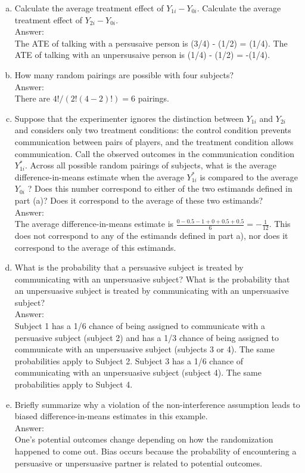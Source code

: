 \documentclass[11pt,notitlepage]{article}\usepackage[]{graphicx}\usepackage[]{color}
\begin{document}
\begin{enumerate}[a)]
\item Calculate the average treatment effect of $Y_{1i} - Y_{0i}$. Calculate the average treatment effect of $Y_{2i} - Y_{0i}$.\\
Answer:\\
The ATE of talking with a persusaive person is (3/4) - (1/2) = (1/4). The ATE of talking with an unpersusaive person is (1/4) - (1/2) = -(1/4). 
\item How many random pairings are possible with four subjects?\\
Answer:\\
There are $4!/(2!(4-2)!) = 6$ pairings.
\item Suppose that the experimenter ignores the distinction between $Y_{1i}$ and $Y_{2i}$ and considers only two treatment conditions: the control condition prevents communication between pairs of players, and the treatment condition allows communication. Call the observed outcomes in the communication condition $Y^{*}_{1i}$. Across all possible random pairings of subjects, what is the average difference-in-means estimate when the average $Y^{*}_{1i}$ is compared to the average $Y_{0i}$ ? Does this number correspond to either of the two estimands defined in part (a)? Does it correspond to the average of these two estimands? \\
Answer:\\
The average difference-in-means estimate is $\frac{0 - 0.5 -1 + 0 + 0.5 + 0.5}{6} = -\frac{1}{12}$. This does not correspond to any of the estimands defined in part a), nor does it correspond to the average of this estimands.

\item What is the probability that a persuasive subject is treated by communicating with an unpersuasive subject? What is the probability that an unpersuasive subject is treated by communicating with an unpersuasive subject? \\
Answer:\\
Subject 1 has a 1/6 chance of being assigned to communicate with a persuasive subject (subject 2) and has a 1/3 chance of being assigned to communicate with an unpersuasive subject (subjects 3 or 4). The same probabilities apply to Subject 2. Subject 3 has a 1/6 chance of communicating with an unpersuasive subject (subject 4).  The same probabilities apply to Subject 4.
\item Briefly summarize why a violation of the non-interference assumption leads to biased difference-in-means estimates in this example. \\
Answer:\\
One's potential outcomes change depending on how the randomization happened to come out. Bias occurs because the probability of encountering a persuasive or unpersuasive partner is related to potential outcomes.


\end{enumerate}
\end{document}
